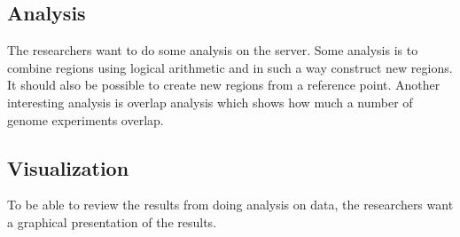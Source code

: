 \subsection{Analysis}
The researchers want to do some analysis on the server. Some analysis is to combine regions using logical arithmetic and in such a way construct new regions. It should also be possible to create new regions from a reference point. Another interesting analysis is overlap analysis which shows how much a number of genome experiments overlap.

\subsection{Visualization}
To be able to review the results from doing analysis on data,  the researchers want a graphical presentation of the results.